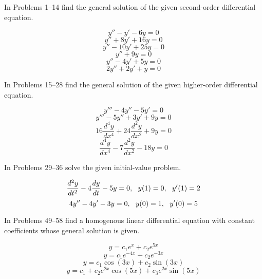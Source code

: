 \documentclass[chapter=4,section=3]{math252homework}
\begin{document}

In Problems 1--14 find the general solution of the given second-order differential equation.
\begin{problems}[start=3]
	\problem[prb:4.3-3] \[ y'' - y' - 6y = 0 \]				%
	\setcounter{problemsi}{4}
	\problem[prb:4.3-5] \[ y'' + 8y' + 16y = 0 \]				%
	\problem[prb:4.3-6] \[ y'' - 10y' + 25y = 0 \]			%
	\setcounter{problemsi}{8}
	\problem[prb:4.3-9] \[ y'' + 9y = 0 \] 					%
	\setcounter{problemsi}{10}
	\problem[prb:4.3-11] \[ y'' - 4y' + 5y = 0 \] 				%
	\problem[prb:4.3-12] \[ 2y'' + 2y' + y = 0 \] 				%
\end{problems}

In Problems 15--28 find the general solution of the given higher-order differential equation.
\begin{problems}[start=15]
	\problem[prb:4.3-15] \[ y''' - 4y'' - 5y' = 0 \]										%
	\setcounter{problemsi}{16}
	\problem[prb:4.3-17] \[ y''' - 5y'' + 3y' + 9y = 0 \]									%
	\setcounter{problemsi}{24}
	\problem[prb:4.3-25] \[ 16\frac{d^{4}y}{dx^{4}} + 24\frac{d^{2}y}{dx^{2}} + 9y = 0 \]	%
	\problem[prb:4.3-26] \[ \frac{d^{4}y}{dx^{4}} - 7\frac{d^{2}y}{dx^{2}} - 18y = 0 \]	%
\end{problems}

In Problems 29--36 solve the given initial-value problem.
\begin{problems}[start=31]
	\problem[prb:4.3-31] \[ \frac{d^{2}y}{dt^{2}} - 4\frac{dy}{dt} - 5y = 0,\mbox{{ }{ }} y(1)=0,\mbox{{ }{ }} y'(1)=2 \]			%
	\problem[prb:4.3-32] \[ 4y'' - 4y' - 3y = 0,\mbox{{ }{ }} y(0)=1,\mbox{{ }{ }} y'(0)=5 \]										%
\end{problems}

In Problems 49--58 find a homogenous linear differential equation with constant coefficients whose general solution is given.
\begin{problems}[start=49]
	\problem[prb:4.3-49] \[ y = c_{1}e^{x} + c_{2}e^{5x} \]							%
	\problem[prb:4.3-50] \[ y = c_{1}e^{-4x} + c_{2}e^{-3x} \]							%
	\setcounter{problemsi}{52}
	\problem[prb:4.3-53] \[ y = c_{1}\cos(3x) + c_{2}\sin(3x) \]						%
	\setcounter{problemsi}{55}
	\problem[prb:4.3-56] \[ y = c_{1} + c_{2}e^{2x}\cos(5x) + c_{3}e^{2x}\sin(5x) \]	%
\end{problems}
\end{document}
